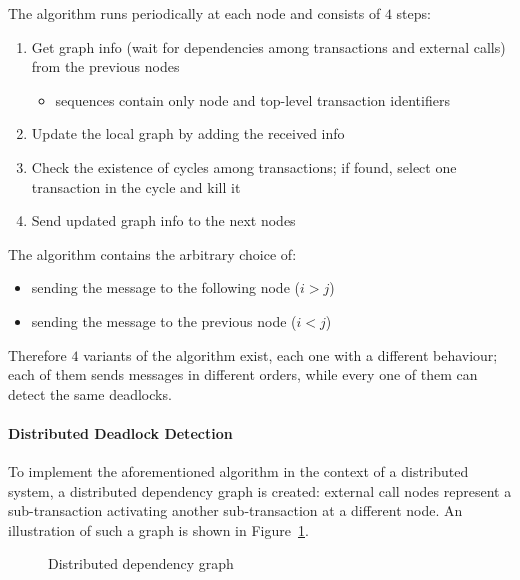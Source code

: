 \documentclass[english]{article}
\begin{document}
\bigskip
The algorithm runs periodically at each node and consists of \(4\) steps:

\begin{enumerate}
  \item Get graph info (wait for dependencies among transactions and external calls) from the previous nodes
        \begin{itemize}[label=\(\rightarrow\)]
          \item sequences contain only node and top-level transaction identifiers
        \end{itemize}
  \item Update the local graph by adding the received info
  \item Check the existence of cycles among transactions; if found, select one transaction in the cycle and kill it
  \item Send updated graph info to the next nodes
\end{enumerate}

\bigskip
The algorithm contains the arbitrary choice of:
\begin{itemize}
  \item sending the message to the following node (\(i > j\))
  \item sending the message to the previous node (\(i < j\))
\end{itemize}
Therefore \(4\) variants of the algorithm exist, each one with a different behaviour;
each of them sends messages in different orders, while every one of them can detect the same deadlocks.

\paragraph{Distributed Deadlock Detection}

To implement the aforementioned algorithm in the context of a distributed system, a distributed dependency graph is created:
external call nodes represent a sub-transaction activating another sub-transaction at a different node.
An illustration of such a graph is shown in Figure~\ref{fig:distributed-dep-graph}.

\begin{figure}[htbp]
  \centering
  \bigskip
  \caption{Distributed dependency graph}
  \label{fig:distributed-dep-graph}
  \bigskip
\end{figure}
\end{document}
